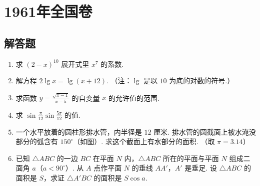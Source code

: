 \documentclass[UTF8,a4paper,oneside,11pt]{ctexbook}
\begin{document}
\mainmatter

\chapter{1961年全国卷}

\section{解答题}

\begin{problem}
\begin{enumerate}
\item 求 \(\left(2-x\right)^{10}\) 展开式里 \(x^7\) 的系数.

\item 解方程 \(2\lg x=\lg\left(x+12\right)\). （注：\(\lg\) 是以 \(10\) 为底的对数的符号.）

\item 求函数 \(y=\frac{\sqrt{x-1}}{x-5}\) 的自变量 \(x\) 的允许值的范围.

\item 求 \(\sin\frac{\pi}{12}\sin\frac{5\pi}{12}\) 的值.

\item 一个水平放着的圆柱形排水管，内半径是 \(12\text{ 厘米}\). 排水管的圆截面上被水淹没部分的弧含有 \(150^\circ\)（如图）. 求这个截面上有水部分的面积. （取 \(\pi=3.14\)）

\item 已知 \(\triangle ABC\) 的一边 \(BC\) 在平面 \(N\) 内，\(\triangle ABC\) 所在的平面与平面 \(N\) 组成二面角 \(a\)（\(a<90^\circ\)）. 从 \(A\) 点作平面 \(N\) 的垂线 \(AA'\)，\(A'\) 是垂足. 设 \(\triangle ABC\) 的面积是 \(S\)，求证 \(\triangle A'BC\) 的面积是 \(S\cos a\).
\end{enumerate}

\end{problem}
\end{document}
